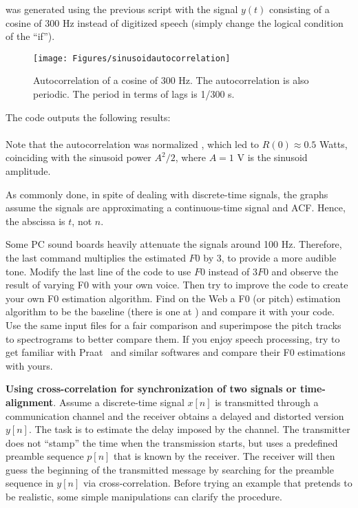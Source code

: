 was generated using the previous script with the signal $y(t)$ consisting of a cosine of 300 Hz instead of digitized speech (simply change the logical condition of the ``if'').

\begin{figure}
	\centering
		\texttt{[image: Figures/sinusoidautocorrelation]}		
	\caption[Autocorrelation of a cosine of 300 Hz]{Autocorrelation of a cosine of 300 Hz. The autocorrelation is also periodic. The period in terms of lags is 1/300 s.\label{fig:sinusoidautocorrelation}}
\end{figure}
The code outputs the following results:\\
\\
Note that the autocorrelation was normalized , which led to $R(0) \approx 0.5$ Watts, coinciding with the sinusoid power $A^2/2$, where $A=1$ V is the sinusoid amplitude.

As commonly done, in spite of dealing with discrete-time signals, the graphs assume the signals are approximating a continuous-time signal and ACF. Hence, the abscissa is $t$, not $n$.

Some PC sound boards heavily attenuate the signals around 100 Hz. Therefore, the last command multiplies the estimated $F0$ by 3, to provide a more audible tone. Modify the last line of the code to use $F0$ instead of $3 F0$ and observe the result of varying F0 with your own voice. 
Then try to improve the code to create your own F0 estimation algorithm.
Find on the Web a {\matlab} F0 (or pitch) estimation algorithm to be the baseline (there is one at
) and compare it with your code. Use the same input files for a fair comparison and superimpose the pitch tracks to spectrograms to better compare them. If you enjoy speech processing, try to get familiar with Praat~ and similar softwares and compare their F0 estimations with yours.
\eApplication 

\bApplication \textbf{Using cross-correlation for synchronization of two signals or time-alignment}.
\label{app:crosscorrelation}
Assume a discrete-time signal $x[n]$ is transmitted through a communication channel and the receiver obtains a delayed and distorted version $y[n]$. The task is to estimate the delay imposed by the channel. The transmitter does not ``stamp'' the time when the transmission starts, but uses a predefined preamble sequence $p[n]$ that is known by the receiver. The receiver will then guess the beginning of the transmitted message by searching for the preamble sequence in $y[n]$ via cross-correlation. Before trying an example that pretends to be realistic, some simple manipulations can clarify the procedure.

